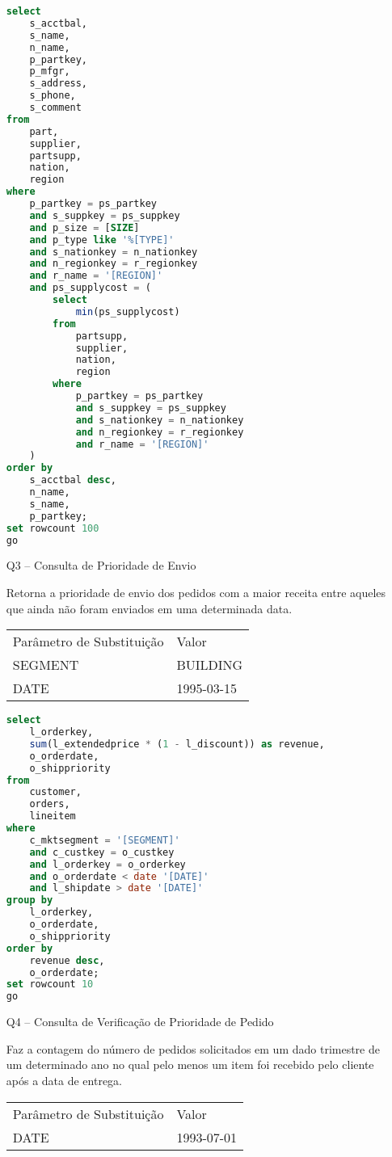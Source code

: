 \begin{enumerate}
	\begin{lstlisting}[language=SQL]
select
	s_acctbal,
	s_name,
	n_name,
	p_partkey,
	p_mfgr,
	s_address,
	s_phone,
	s_comment
from
	part,
	supplier,
	partsupp,
	nation,
	region
where
	p_partkey = ps_partkey
	and s_suppkey = ps_suppkey
	and p_size = [SIZE]
	and p_type like '%[TYPE]'
	and s_nationkey = n_nationkey
	and n_regionkey = r_regionkey
	and r_name = '[REGION]'
	and ps_supplycost = (
		select
			min(ps_supplycost)
		from
			partsupp,
			supplier,
			nation,
			region
		where
			p_partkey = ps_partkey
			and s_suppkey = ps_suppkey
			and s_nationkey = n_nationkey
			and n_regionkey = r_regionkey
			and r_name = '[REGION]'
	)
order by
	s_acctbal desc,
	n_name,
	s_name,
	p_partkey;
set rowcount 100
go
	\end{lstlisting}

\item[Q3 --] Consulta de Prioridade de Envio
	
	Retorna a prioridade de envio dos pedidos com a maior receita entre aqueles que ainda não foram enviados em uma determinada data.
	
\begin{tabular}{ll}
	Parâmetro de Substituição & Valor\\
	SEGMENT & BUILDING\\
	DATE & 1995-03-15\\
\end{tabular}

	\begin{lstlisting}[language=SQL]
select
	l_orderkey,
	sum(l_extendedprice * (1 - l_discount)) as revenue,
	o_orderdate,
	o_shippriority
from
	customer,
	orders,
	lineitem
where
	c_mktsegment = '[SEGMENT]'
	and c_custkey = o_custkey
	and l_orderkey = o_orderkey
	and o_orderdate < date '[DATE]'
	and l_shipdate > date '[DATE]'
group by
	l_orderkey,
	o_orderdate,
	o_shippriority
order by
	revenue desc,
	o_orderdate;
set rowcount 10
go
	\end{lstlisting}
	
\item[Q4 --] Consulta de Verificação de Prioridade de Pedido
		
	Faz a contagem do número de pedidos solicitados em um dado trimestre de um determinado ano no qual pelo menos um item foi recebido pelo cliente após a data de entrega.
	
\begin{tabular}{ll}
	Parâmetro de Substituição & Valor\\
	DATE & 1993-07-01\\
\end{tabular}


\end{enumerate}

